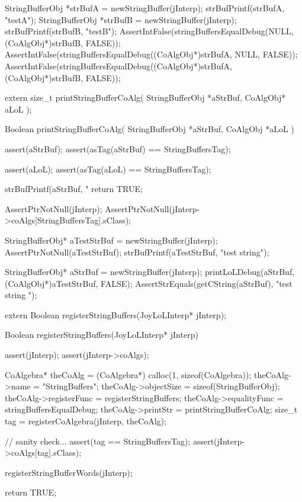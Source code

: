
\startCTest
  StringBufferObj *strBufA = newStringBuffer(jInterp);
  strBufPrintf(strBufA, "testA");
  StringBufferObj *strBufB = newStringBuffer(jInterp);
  strBufPrintf(strBufB, "testB");
  AssertIntFalse(stringBuffersEqualDebug(NULL, (CoAlgObj*)strBufB, FALSE));
  AssertIntFalse(stringBuffersEqualDebug((CoAlgObj*)strBufA, NULL, FALSE));
  AssertIntFalse(stringBuffersEqualDebug((CoAlgObj*)strBufA, (CoAlgObj*)strBufB, FALSE));
\stopCTest
\stopTestCase
\stopTestSuite


\startCHeader
extern size_t printStringBufferCoAlg(
  StringBufferObj *aStrBuf,
  CoAlgObj* aLoL
);
\stopCHeader

\startCCode
Boolean printStringBufferCoAlg(
  StringBufferObj *aStrBuf,
  CoAlgObj        *aLoL
) {
  assert(aStrBuf);
  assert(asTag(aStrBuf) == StringBuffersTag);
  
  assert(aLoL);
  assert(asTag(aLoL) == StringBuffersTag);

  strBufPrintf(aStrBuf, "%
  return TRUE;
}
\stopCCode


\startCTest
  AssertPtrNotNull(jInterp);
  AssertPtrNotNull(jInterp->coAlgs[StringBuffersTag].sClass);

  StringBufferObj* aTestStrBuf = newStringBuffer(jInterp);
  AssertPtrNotNull(aTestStrBuf);
  strBufPrintf(aTestStrBuf, "test string");
  
  StringBufferObj* aStrBuf = newStringBuffer(jInterp);
  printLoLDebug(aStrBuf, (CoAlgObj*)aTestStrBuf, FALSE);
  AssertStrEquals(getCString(aStrBuf), "test string ");
\stopCTest
\stopTestCase
\stopTestSuite

\startTestSuite[registerStringBuffers]

\startCHeader
extern Boolean registerStringBuffers(JoyLoLInterp* jInterp);
\stopCHeader
{}

\startCCode
Boolean registerStringBuffers(JoyLoLInterp* jInterp) {
  assert(jInterp);
  assert(jInterp->coAlgs);
  
  CoAlgebra* theCoAlg    = (CoAlgebra*) calloc(1, sizeof(CoAlgebra));
  theCoAlg->name         = "StringBuffers";
  theCoAlg->objectSize   = sizeof(StringBufferObj);
  theCoAlg->registerFunc = registerStringBuffers;
  theCoAlg->equalityFunc = stringBuffersEqualDebug;
  theCoAlg->printStr     = printStringBufferCoAlg;
  size_t tag = registerCoAlgebra(jInterp, theCoAlg);
  
  // sanity check...
  assert(tag == StringBuffersTag);
  assert(jInterp->coAlgs[tag].sClass);

  registerStringBufferWords(jInterp);

  return TRUE;
}
\stopCCode

